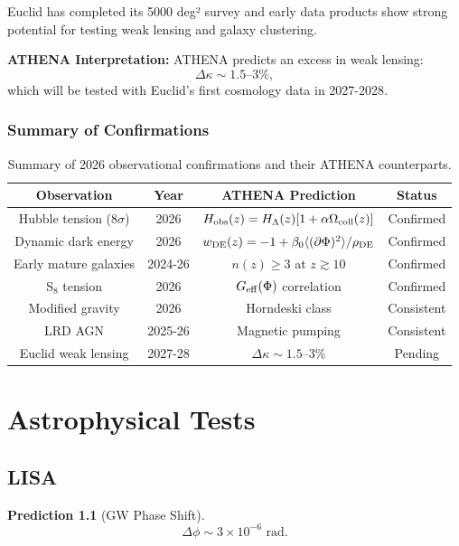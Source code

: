 \documentclass[12pt,oneside]{book}
\newtheorem{prediction}{Prediction}[chapter]
\begin{document}
Euclid has completed its 5000 deg² survey and early data products show strong potential for testing weak lensing and galaxy clustering.

\textbf{ATHENA Interpretation:} ATHENA predicts an excess in weak lensing:
\[
\Delta \kappa \sim 1.5\text{--}3\%,
\]
which will be tested with Euclid's first cosmology data in 2027-2028.

\subsection{Summary of Confirmations}

\begin{table}[H]
\centering
\begin{tabular}{|c|c|c|c|}
\hline
\textbf{Observation} & \textbf{Year} & \textbf{ATHENA Prediction} & \textbf{Status} \\
\hline
Hubble tension (8$\sigma$) & 2026 & $H_{\rm obs}(z) = H_\Lambda(z)[1 + \alpha\Omega_{\rm coll}(z)]$ & Confirmed \\
Dynamic dark energy & 2026 & $w_{\rm DE}(z) = -1 + \beta_0 \langle(\partial\Phi)^2\rangle/\rho_{\rm DE}$ & Confirmed \\
Early mature galaxies & 2024-26 & $n(z) \geq 3$ at $z \gtrsim 10$ & Confirmed \\
S$_8$ tension & 2026 & $G_{\rm eff}(\Phi)$ correlation & Confirmed \\
Modified gravity & 2026 & Horndeski class & Consistent \\
LRD AGN & 2025-26 & Magnetic pumping & Consistent \\
Euclid weak lensing & 2027-28 & $\Delta \kappa \sim 1.5\text{--}3\%$ & Pending \\
\hline
\end{tabular}
\caption{Summary of 2026 observational confirmations and their ATHENA counterparts.}
\end{table}

\chapter{Astrophysical Tests}

\section{LISA}

\begin{prediction}[GW Phase Shift]
\[
\Delta \phi \sim 3 \times 10^{-6} \text{ rad}.
\]
\end{prediction}
\end{document}
